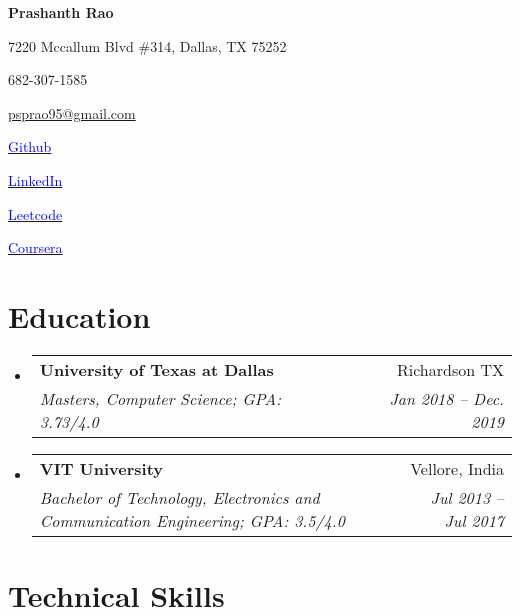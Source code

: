 \documentclass[letterpaper,11pt]{article}
\makeatletter
\newcommand{\resumeSubheading}[4]{
  \vspace{-1pt}\item
    \begin{tabular*}{0.97\textwidth}{l@{\extracolsep{\fill}}r}
      \textbf{#1} & #2 \\
      \textit{\small#3} & \textit{\small #4} \\
    \end{tabular*}\vspace{-5pt}
}
\newcommand{\resumeSubHeadingListStart}{\begin{itemize}[leftmargin=*]}
\newcommand{\resumeSubHeadingListEnd}{\end{itemize}}
\makeatother
\begin{document}
\begin{center}
  \textbf{\Huge Prashanth Rao}\\
  \vspace{0.05in}


    
    
    \begin{itemize*}
    \item7220 Mccallum Blvd \#314, Dallas, TX 75252
    \hspace{4in}
     \item  682-307-1585
     \hspace{1in}
     \item \href{mailto:psprao95@gmail.com}{psprao95@gmail.com}
    \end{itemize*}


  
  \begin{itemize*}
    \item   \href{https://www.github.com/psprao95}{\textcolor{blue}{Github}}
     \item   \href{https://www.linkedin.com/in/psprao}{\textcolor{blue}{LinkedIn}}
       \item   \href{https://www.leetcode.com/psprao95}{\textcolor{blue}{Leetcode}}
     \item   \href{https://www.coursera.org/user/b5584c6ff8b829314e6ea4476945ee82}{\textcolor{blue}{Coursera}}
    \hspace{8in}
  
  
  \end{itemize*}
\end{center}

\section{Education}
  \resumeSubHeadingListStart
    \resumeSubheading
      {University of Texas at Dallas}{Richardson TX}
      {Masters, Computer Science;  GPA: 3.73/4.0}{Jan 2018 -- Dec. 2019}
    \resumeSubheading
      {VIT University}{Vellore, India}
      {Bachelor of Technology, Electronics and Communication Engineering;  GPA: 3.5/4.0}{Jul 2013 -- Jul 2017}
  \resumeSubHeadingListEnd



\section{Technical Skills}
\end{document}
